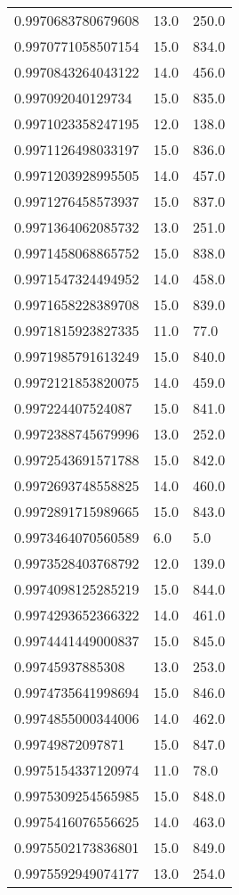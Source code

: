 \begin{center}
\begin{supertabular}[H]{p{0.30\textwidth}p{0.05\textwidth}p{0.05\textwidth}}
0.9970683780679608 & 13.0 & 250.0 \\ 
0.9970771058507154 & 15.0 & 834.0 \\ 
0.9970843264043122 & 14.0 & 456.0 \\ 
0.997092040129734 & 15.0 & 835.0 \\ 
0.9971023358247195 & 12.0 & 138.0 \\ 
0.9971126498033197 & 15.0 & 836.0 \\ 
0.9971203928995505 & 14.0 & 457.0 \\ 
0.9971276458573937 & 15.0 & 837.0 \\ 
0.9971364062085732 & 13.0 & 251.0 \\ 
0.9971458068865752 & 15.0 & 838.0 \\ 
0.9971547324494952 & 14.0 & 458.0 \\ 
0.9971658228389708 & 15.0 & 839.0 \\ 
0.9971815923827335 & 11.0 & 77.0 \\ 
0.9971985791613249 & 15.0 & 840.0 \\ 
0.9972121853820075 & 14.0 & 459.0 \\ 
0.997224407524087 & 15.0 & 841.0 \\ 
0.9972388745679996 & 13.0 & 252.0 \\ 
0.9972543691571788 & 15.0 & 842.0 \\ 
0.9972693748558825 & 14.0 & 460.0 \\ 
0.9972891715989665 & 15.0 & 843.0 \\ 
0.9973464070560589 & 6.0 & 5.0 \\ 
0.9973528403768792 & 12.0 & 139.0 \\ 
0.9974098125285219 & 15.0 & 844.0 \\ 
0.9974293652366322 & 14.0 & 461.0 \\ 
0.9974441449000837 & 15.0 & 845.0 \\ 
0.99745937885308 & 13.0 & 253.0 \\ 
0.9974735641998694 & 15.0 & 846.0 \\ 
0.9974855000344006 & 14.0 & 462.0 \\ 
0.99749872097871 & 15.0 & 847.0 \\ 
0.9975154337120974 & 11.0 & 78.0 \\ 
0.9975309254565985 & 15.0 & 848.0 \\ 
0.9975416076556625 & 14.0 & 463.0 \\ 
0.9975502173836801 & 15.0 & 849.0 \\ 
0.9975592949074177 & 13.0 & 254.0 \\ 

\end{supertabular}
\end{center}
